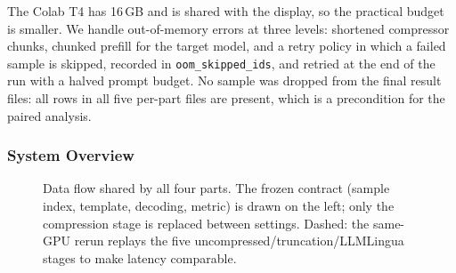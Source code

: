 \documentclass[10pt,a4paper,twocolumn]{article}
\begin{document}
The Colab T4 has 16\,GB and is shared with the display, so the practical budget is
smaller. We handle out-of-memory errors at three levels: shortened compressor
chunks, chunked prefill for the target model, and a retry policy in which a
failed sample is skipped, recorded in \texttt{oom\_skipped\_ids}, and retried at the
end of the run with a halved prompt budget. No sample was dropped from the final
result files: all rows in all five per-part files are present, which is a
precondition for the paired analysis.

\subsubsection{System Overview}

\begin{figure}[t]
\centering
{}
\caption{Data flow shared by all four parts. The frozen contract (sample index,
template, decoding, metric) is drawn on the left; only the compression stage is
replaced between settings. Dashed: the same-GPU rerun replays the five
uncompressed/truncation/LLMLingua stages to make latency comparable.}
\label{fig:system}
\end{figure}
\end{document}
